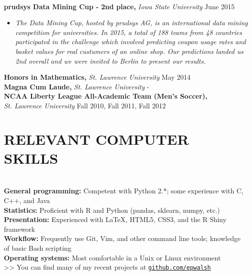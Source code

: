 \documentclass{res} %
\begin{document}
\begin{resume}
\hrulefill \\
{\bf prudsys Data Mining Cup - 2nd place,} {\sl Iowa State University} \dotfill June 2015 
\begin{itemize}[label=>>]
  \item \emph{The Data Mining Cup, hosted by prudsys AG, is an international data
    mining competition for universities. In 2015, a total of 188 teams from 48
    countries participated in the challenge which involved predicting coupon
    usage rates and basket values for real custumers of an online shop. Our
    predictions landed us 2nd overall and we were invited to Berlin to
    present our results.}
\end{itemize}
\vspace{-1em}
{\bf Honors in Mathematics,} {\sl St. Lawrence University} \dotfill May 2014 \\
{\bf Magna Cum Laude,} {\sl St. Lawrence University} \hfill - \\
{\bf NCAA Liberty League All-Academic Team (Men's Soccer),} \\
{\sl St. Lawrence University} \dotfill Fall 2010, Fall 2011, Fall 2012 


\section{RELEVANT COMPUTER SKILLS}

\hrulefill \\
{\bf General programming:} Competent with Python 2.*; some experience with C, C++, and Java \\
{\bf Statistics:} Proficient with R and Python (pandas, sklearn, numpy, etc.) \\
{\bf Presentation:} Experienced with \LaTeX, HTML5, CSS3, and the R Shiny framework \\
{\bf Workflow:} Frequently use Git, Vim, and other command line tools; knowledge of basic Bash scripting \\
{\bf Operating systems:} Most comfortable in a Unix or Linux environment \\
>> You can find many of my recent projects at \href{http://github.com/epwalsh}{\texttt{github.com/epwalsh}}



\end{resume}
\end{document}
